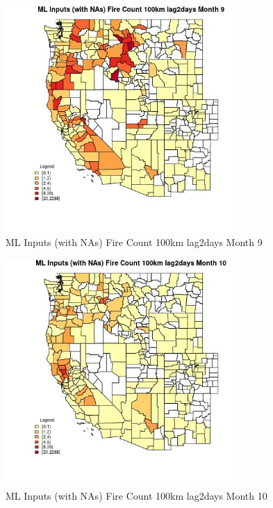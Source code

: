 \begin{figure} 
\centering  
\includegraphics[width=0.77\textwidth]{Code_Outputs/Report_ML_input_PM25_Step4_part_e_de_duplicated_aves_compiled_2019-05-20wNAs_CountyFire_Count_100km_lag2daysmedianMonth9.jpg} 
\caption{\label{fig:Report_ML_input_PM25_Step4_part_e_de_duplicated_aves_compiled_2019-05-20wNAsCountyFire_Count_100km_lag2daysmedianMonth9}ML Inputs (with NAs) Fire Count 100km lag2days Month 9} 
\end{figure} 
 

\begin{figure} 
\centering  
\includegraphics[width=0.77\textwidth]{Code_Outputs/Report_ML_input_PM25_Step4_part_e_de_duplicated_aves_compiled_2019-05-20wNAs_CountyFire_Count_100km_lag2daysmedianMonth10.jpg} 
\caption{\label{fig:Report_ML_input_PM25_Step4_part_e_de_duplicated_aves_compiled_2019-05-20wNAsCountyFire_Count_100km_lag2daysmedianMonth10}ML Inputs (with NAs) Fire Count 100km lag2days Month 10} 
\end{figure} 
 

